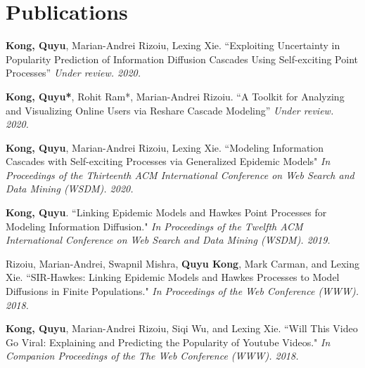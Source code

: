 \documentclass[a4paper,10pt]{article}
\newcommand{\tabitem}{~~\llap{\textbullet}~~}
\begin{document}


\section{Publications}
\begin{enumerate}[label={[\arabic*]}]
    \item \textbf{Kong, Quyu}, Marian-Andrei Rizoiu, Lexing Xie. ``Exploiting Uncertainty in Popularity Prediction of Information Diffusion Cascades Using Self-exciting Point Processes'' \textit{Under review. 2020.}
     \item \textbf{Kong, Quyu*}, Rohit Ram*, Marian-Andrei Rizoiu. ``A Toolkit for Analyzing and Visualizing Online Users via Reshare Cascade Modeling'' \textit{Under review. 2020.}
    \item \textbf{Kong, Quyu}, Marian-Andrei Rizoiu, Lexing Xie. ``Modeling Information Cascades with Self-exciting Processes via Generalized Epidemic Models" \textit{In Proceedings of the Thirteenth ACM International Conference on Web Search and Data Mining (WSDM). 2020.}
    \item \textbf{Kong, Quyu}. ``Linking Epidemic Models and Hawkes Point Processes for Modeling Information Diffusion." \textit{In Proceedings of the Twelfth ACM International Conference on Web Search and Data Mining (WSDM). 2019.}
    \item Rizoiu, Marian-Andrei, Swapnil Mishra, \textbf{Quyu Kong}, Mark Carman, and Lexing Xie. ``SIR-Hawkes: Linking Epidemic Models and Hawkes Processes to Model Diffusions in Finite Populations." \textit{In Proceedings of the Web Conference (WWW). 2018.}
    \item \textbf{Kong, Quyu}, Marian-Andrei Rizoiu, Siqi Wu, and Lexing Xie. ``Will This Video Go Viral: Explaining and Predicting the Popularity of Youtube Videos." \textit{In Companion Proceedings of the The Web Conference (WWW). 2018.}
\end{enumerate}
\end{document}
